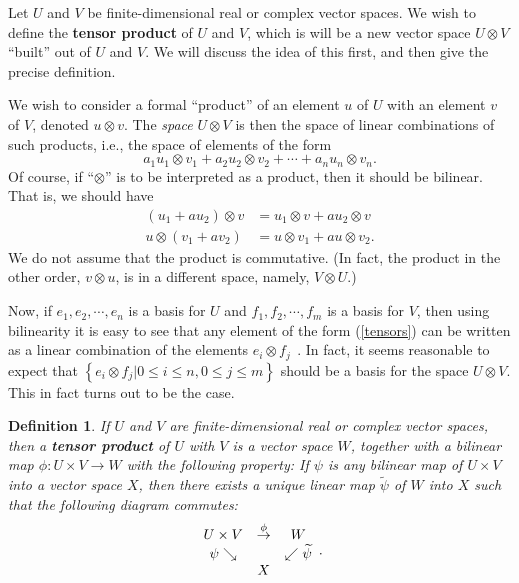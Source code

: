 \documentclass{amsbook}
\theoremstyle{plain}
\newtheorem{definition}[theorem]{Definition}
\numberwithin{equation}{chapter}
\numberwithin{theorem}{chapter}
\begin{document}
Let $U$ and $V$ be finite-dimensional real or complex vector spaces. We wish
to define the \textbf{tensor product} of $U$ and $V$, which is will be a new
vector space $U\otimes V$ ``built'' out of $U$ and $V$. We will discuss the
idea of this first, and then give the precise definition.

We wish to consider a formal ``product'' of an element $u$ of $U$ with an
element $v$ of $V$, denoted $u\otimes v$. The \textit{space} $U\otimes V$ is
then the space of linear combinations of such products, i.e., the space of
elements of the form
\begin{equation}
a_{1}u_{1}\otimes v_{1}+a_{2}u_{2}\otimes v_{2}+\cdots+a_{n}u_{n}\otimes
v_{n}\text{.}\label{tensors}%
\end{equation}
Of course, if ``$\otimes$'' is to be interpreted as a product, then it should
be bilinear. That is, we should have
\begin{align*}
\left(  u_{1}+au_{2}\right)  \otimes v  & =u_{1}\otimes v+au_{2}\otimes v\\
u\otimes\left(  v_{1}+av_{2}\right)   & =u\otimes v_{1}+au\otimes
v_{2}\text{.}%
\end{align*}
We do not assume that the product is commutative. (In fact, the product in the
other order, $v\otimes u$, is in a different space, namely, $V\otimes U$.)

Now, if $e_{1},e_{2},\cdots,e_{n}$ is a basis for $U$ and $f_{1},f_{2}%
,\cdots,f_{m}$ is a basis for $V$, then using bilinearity it is easy to see
that any element of the form (\ref{tensors}) can be written as a linear
combination of the elements $e_{i}\otimes f_{j\text{ }}$. In fact, it seems
reasonable to expect that $\left\{  e_{i}\otimes f_{j}\left|  0\leq i\leq
n,0\leq j\leq m\right.  \right\}  $ should be a basis for the space $U\otimes
V$. This in fact turns out to be the case.

\begin{definition}
If $U$ and $V$ are finite-dimensional real or complex vector spaces, then a
\textbf{tensor product} of $U$ with $V$ is a vector space $W$, together with a
bilinear map $\phi:U\times V\rightarrow W$ with the following property: If
$\psi$ is any bilinear map of $U\times V$ into a vector space $X$, then there
exists a unique linear map $\widetilde{\psi}$ of $W$ into $X$ such that the
following diagram commutes:
\[%
\begin{array}
[c]{ccc}%
U\times V & \overset{\phi}{\rightarrow} & W\\
\psi\searrow &  & \swarrow\widetilde{\psi}\\
& X &
\end{array}
\text{.}%
\]
\end{definition}
\end{document}
